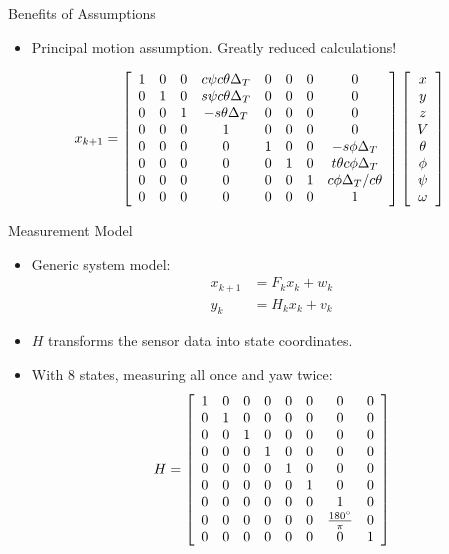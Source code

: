 \documentclass[hyperref={pdfpagelabels=false}]{beamer}
\begin{document}
\begin{frame}{Benefits of Assumptions}
\begin{itemize}
\item Principal motion assumption. Greatly reduced calculations!
\end{itemize}
{\tiny
\begin{align*}
x_{k+1} = \left[\begin{array}{c c c c c c c c}
1 & 0 & 0 & c\psi c\theta \Delta_T & 0 & 0 & 0 & 0 \\
0 & 1 & 0 & s\psi c\theta \Delta_T & 0 & 0 & 0 & 0\\
0 & 0 & 1 & -s\theta \Delta_T & 0 & 0 & 0 & 0\\
0 & 0 & 0 & 1 & 0 & 0 & 0 & 0 \\
0 & 0 & 0 & 0 & 1 & 0 & 0 & -s\phi \Delta_T \\
0 & 0 & 0 & 0 & 0 & 1 & 0 & t\theta c\phi \Delta_T \\
0 & 0 & 0 & 0 & 0 & 0 & 1 & c\phi \Delta_T/c\theta \\
0 & 0 & 0 & 0 & 0 & 0 & 0 & 1
\end{array}\right]
\left[\begin{array}{c}
x \\ y \\ z \\ V \\ \theta \\ \phi \\ \psi \\ \omega
\end{array}\right]
\end{align*}
}
\end{frame}

\begin{frame}{Measurement Model}
\begin{itemize}
\item Generic system model:
\begin{align*}
x_{k+1} &= F_kx_k + w_k \\
y_k &= H_kx_k + v_k
\end{align*}
\item $H$ transforms the sensor data into state coordinates.
\item With 8 states, measuring all once and yaw twice:
\begin{align*}
H = \left[\begin{array}{c c c c c c c c}
1 & 0 & 0 & 0 & 0 & 0 & 0 & 0 \\
0 & 1 & 0 & 0 & 0 & 0 & 0 & 0 \\
0 & 0 & 1 & 0 & 0 & 0 & 0 & 0 \\
0 & 0 & 0 & 1 & 0 & 0 & 0 & 0 \\
0 & 0 & 0 & 0 & 1 & 0 & 0 & 0 \\
0 & 0 & 0 & 0 & 0 & 1 & 0 & 0 \\
0 & 0 & 0 & 0 & 0 & 0 & 1 & 0 \\
0 & 0 & 0 & 0 & 0 & 0 & \frac{180^\circ}{\pi} & 0 \\
0 & 0 & 0 & 0 & 0 & 0 & 0 & 1
\end{array}\right]
\end{align*}
\end{itemize}
\end{frame}
\end{document}
